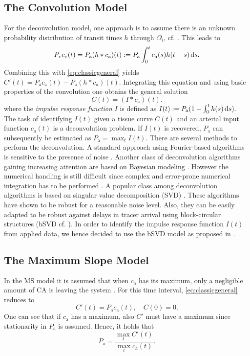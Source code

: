 \documentclass[journal,twocolumn]{IEEEtran}
\newcommand{\ca}{c_\mathrm{a}}
\newcommand{\cout}{c_{\mathrm{v}}}
\newcommand{\Pa}{P_{\mathrm{a}}}
\newcommand{\Pout}{P_{\mathrm{v}}}
\begin{document}
	\subsection{The Convolution Model}\label{sec:conv}
	For the deconvolution model, one approach is to assume there is an unknown probability distribution of transit times $h$ through $\Omega_i$, cf. \cite{sourbron13}. 
	This leads to
	\begin{equation}
		\Pout\cout(t) = \Pa(h\ast\ca)(t) := \Pa\int_0^t \ca(s) h(t-s) \diffint s.
	\end{equation}
	Combining this with \eqref{eq:classicgeneral} yields $C'(t) = \Pa\ca(t)-\Pa (h\ast\ca)(t)$.
	Integrating this equation and using basic properties of the convolution one obtains the general solution
	\begin{equation}
		C(t) = (I\ast\ca)(t).
		\label{eq:conv}
	\end{equation}
	where the \emph{impulse response function} $I$ is defined as $I(t) := \Pa(1-\int_0^t h(s) \diffint s)$.
	The task of identifying $I(t)$ given a tissue curve $C(t)$ and an arterial input function $\ca(t)$ is a deconvolution problem.
	If $I(t)$ is recovered, $\Pa$ can subsequently be estimated as $\Pa = \max_{t} I(t)$.
	There are several methods to perform the deconvolution.
	A standard approach using Fourier-based algorithms is sensitive to the presence of noise \cite{ostergaard96}.
	Another class of deconvolution algorithms gaining increasing attention are based on Bayesian modeling \cite{boutelier12}.
	However the numerical handling is still difficult since complex and error-prone numerical integration has to be performed \cite{boutelier12}.
	A popular class among deconvolution algorithms is based on singular value decomposition (SVD) \cite{ostergaard96}.
	These algorithms have shown to be robust for a reasonable noise level.
	Also, they can be easily adapted to be robust against delays in tracer arrival using block-circular structures (bSVD cf. \cite{wu03}).
	In order to identify the impulse response function $I(t)$ from applied data, we hence decided to use the bSVD model as proposed in \cite{wu03}.

	
	
	\subsection{The Maximum Slope Model}\label{sec:ms}	
	In the MS model it is assumed that when $\ca$ has its maximum, only a negligible amount of CA is leaving the system \cite{klotz99}.
	For this time interval, \eqref{eq:classicgeneral} reduces to 
	\begin{equation}
		C'(t) = \Pa\ca(t), \quad C(0) = 0.
	\end{equation}
	One can see that if $\ca$ has a maximum, also $C'$ must have a maximum since stationarity in $\Pa$ is assumed.
	Hence, it holds that
	\begin{equation}\label{eq:MS}
		\Pa = \frac{\max_{t}C'(t)}{\max_{t}\ca(t)}.
	\end{equation}
\end{document}

